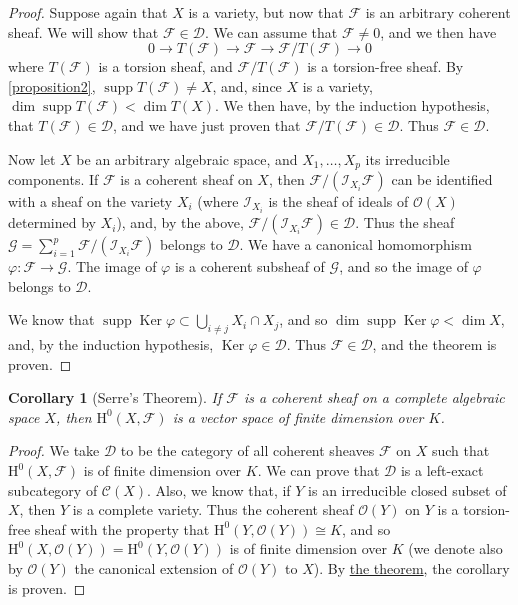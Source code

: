\documentclass{article}
\theoremstyle{plain}
\newtheorem*{cor}{Corollary}
\theoremstyle{definition}
\newcommand{\sh}{\mathscr}
\newcommand{\cat}{\mathcal}
\newcommand{\HH}{\mathrm{H}}
\DeclareMathOperator{\supp}{supp}
\DeclareMathOperator{\Ker}{Ker}
\begin{document}
\begin{proof}
  Suppose again that $X$ is a variety, but now that $\sh{F}$ is an arbitrary coherent sheaf.
  We will show that $\sh{F}\in\cat{D}$.
  We can assume that $\sh{F}\neq0$, and we then have
  \[
    0 \to T(\sh{F}) \to \sh{F} \to \sh{F}/T(\sh{F}) \to 0
  \]
  where $T(\sh{F})$ is a torsion sheaf, and $\sh{F}/T(\sh{F})$ is a torsion-free sheaf.
  By \cref{proposition2}, $\supp T(\sh{F})\neq X$, and, since $X$ is a variety, $\dim\supp T(\sh{F})<\dim T(X)$.
  We then have, by the induction hypothesis, that $T(\sh{F})\in\cat{D}$, and we have just proven that $\sh{F}/T(\sh{F})\in\cat{D}$.
  Thus $\sh{F}\in\cat{D}$.

  Now let $X$ be an arbitrary algebraic space, and $X_1,\ldots,X_p$ its irreducible components.
  If $\sh{F}$ is a coherent sheaf on $X$, then $\sh{F}/(\sh{I}_{X_i}\sh{F})$ can be identified with a sheaf on the variety $X_i$ (where $\sh{I}_{X_i}$ is the sheaf of ideals of $\sh{O}(X)$ determined by $X_i$), and, by the above, $\sh{F}/(\sh{I}_{X_i}\sh{F})\in\cat{D}$.
  Thus the sheaf $\sh{G}=\sum_{i=1}^p\sh{F}/(\sh{I}_{X_i}\sh{F})$ belongs to $\cat{D}$.
  We have a canonical homomorphism $\varphi\colon\sh{F}\to\sh{G}$.
  The image of $\varphi$ is a coherent subsheaf of $\sh{G}$, and so the image of $\varphi$ belongs to $\cat{D}$.

  We know that $\supp\Ker\varphi\subset\bigcup_{i\neq j}X_i\cap X_j$, and so $\dim\supp\Ker\varphi<\dim X$, and, by the induction hypothesis, $\Ker\varphi\in\cat{D}$.
  Thus $\sh{F}\in\cat{D}$, and the theorem is proven.
\end{proof}

\begin{cor}[Serre's Theorem]
  If $\sh{F}$ is a coherent sheaf on a complete algebraic space $X$, then $\HH^0(X,\sh{F})$ is a vector space of finite dimension over $K$.
\end{cor}

\begin{proof}
  We take $\cat{D}$ to be the category of all coherent sheaves $\sh{F}$ on $X$ such that $\HH^0(X,\sh{F})$ is of finite dimension over $K$.
  We can prove that $\cat{D}$ is a left-exact subcategory of $\cat{C}(X)$.
  Also, we know that, if $Y$ is an irreducible closed subset of $X$, then $Y$ is a complete variety.
  Thus the coherent sheaf $\sh{O}(Y)$ on $Y$ is a torsion-free sheaf with the property that $\HH^0(Y,\sh{O}(Y))\cong K$, and so $\HH^0(X,\sh{O}(Y))=\HH^0(Y,\sh{O}(Y))$ is of finite dimension over $K$ (we denote also by $\sh{O}(Y)$ the canonical extension of $\sh{O}(Y)$ to $X$).
  By \hyperref[theorem-devissage]{the theorem}, the corollary is proven.
\end{proof}
\end{document}
